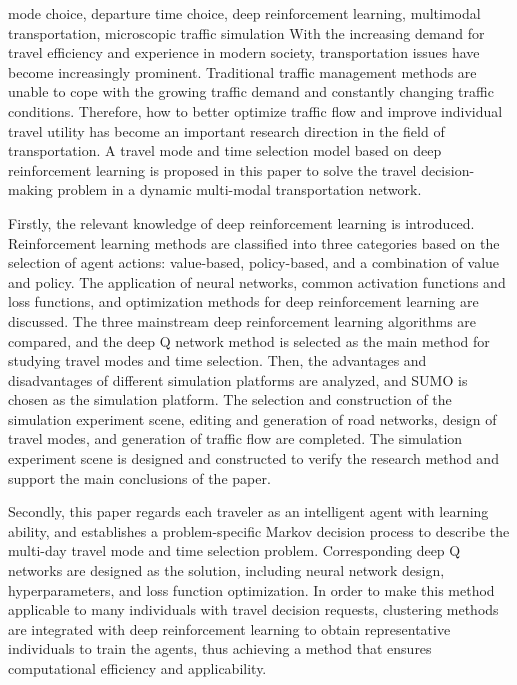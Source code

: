 \begin{englishabstract}{mode choice, departure time choice, deep reinforcement learning, multimodal transportation, microscopic traffic simulation}
With the increasing demand for travel efficiency and experience in modern society, transportation issues have become increasingly prominent. Traditional traffic management methods are unable to cope with the growing traffic demand and constantly changing traffic conditions. Therefore, how to better optimize traffic flow and improve individual travel utility has become an important research direction in the field of transportation. A travel mode and time selection model based on deep reinforcement learning is proposed in this paper to solve the travel decision-making problem in a dynamic multi-modal transportation network.

Firstly, the relevant knowledge of deep reinforcement learning is introduced. Reinforcement learning methods are classified into three categories based on the selection of agent actions: value-based, policy-based, and a combination of value and policy. The application of neural networks, common activation functions and loss functions, and optimization methods for deep reinforcement learning are discussed. The three mainstream deep reinforcement learning algorithms are compared, and the deep Q network method is selected as the main method for studying travel modes and time selection. Then, the advantages and disadvantages of different simulation platforms are analyzed, and SUMO is chosen as the simulation platform. The selection and construction of the simulation experiment scene, editing and generation of road networks, design of travel modes, and generation of traffic flow are completed. The simulation experiment scene is designed and constructed to verify the research method and support the main conclusions of the paper.

Secondly, this paper regards each traveler as an intelligent agent with learning ability, and establishes a problem-specific Markov decision process to describe the multi-day travel mode and time selection problem. Corresponding deep Q networks are designed as the solution, including neural network design, hyperparameters, and loss function optimization. In order to make this method applicable to many individuals with travel decision requests, clustering methods are integrated with deep reinforcement learning to obtain representative individuals to train the agents, thus achieving a method that ensures computational efficiency and applicability.


\end{englishabstract}
